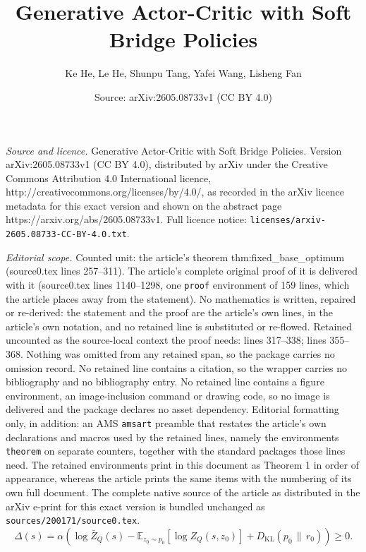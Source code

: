 \documentclass[10pt,a4paper]{amsart}
\title{Generative Actor-Critic with Soft Bridge Policies}
\author{Ke He, Le He, Shunpu Tang, Yafei Wang, Lisheng Fan}
\date{Source: arXiv:2605.08733v1 (CC BY 4.0)}
\begin{document}
\maketitle

\noindent\emph{Source and licence.} Generative Actor-Critic with Soft Bridge Policies. Version arXiv:2605.08733v1 (CC BY 4.0), distributed by arXiv under the Creative Commons Attribution 4.0 International licence, http://creativecommons.org/licenses/by/4.0/, as recorded in the arXiv licence metadata for this exact version and shown on the abstract page https://arxiv.org/abs/2605.08733v1. Full licence notice: \texttt{licenses/arxiv-2605.08733-CC-BY-4.0.txt}.\par\smallskip

\noindent\textit{Editorial scope.} Counted unit: the article's theorem thm:fixed\_base\_optimum (source0.tex lines 257--311). The article's complete original proof of it is delivered with it (source0.tex lines 1140--1298, one \texttt{proof} environment of 159 lines, which the article places away from the statement). No mathematics is written, repaired or re-derived: the statement and the proof are the article's own lines, in the article's own notation, and no retained line is substituted or re-flowed.  Retained uncounted as the source-local context the proof needs: lines 317--338; lines 355--368.  Nothing was omitted from any retained span, so the package carries no omission record.  No retained line contains a citation, so the wrapper carries no bibliography and no bibliography entry.  No retained line contains a figure environment, an image-inclusion command or drawing code, so no image is delivered and the package declares no asset dependency.  Editorial formatting only, in addition: an AMS \texttt{amsart} preamble that restates the article's own declarations and macros used by the retained lines, namely the environments \texttt{theorem} on separate counters, together with the standard packages those lines need.  The retained environments print in this document as Theorem 1 in order of appearance, whereas the article prints the same items with the numbering of its own full document.  The complete native source of the article as distributed in the arXiv e-print for this exact version is bundled unchanged as \texttt{sources/200171/source0.tex}.
\begin{equation}
  \Delta(s)
  =
  \alpha
  \left(
    \log \bar Z_Q(s)
    -
    \mathbb E_{z_0\sim p_0}
    \left[
      \log Z_Q(s,z_0)
    \right]
    +
    D_{\mathrm{KL}}
    \left(
      p_0
      \,\|\,
      r_0
    \right)
  \right)
  \ge 0.
  \label{eq:base_jensen_gap}
\end{equation}
\end{document}
